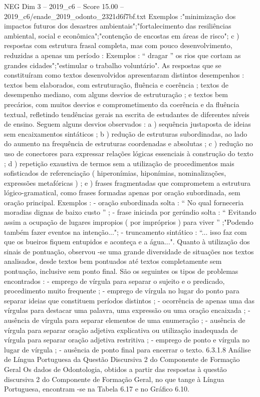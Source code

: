 \begin{textsample}{NEG Dim 3 – 2019\_c6 – Score 15.00 – 2019\_c6/enade\_2019\_odonto\_2321d6f7bf.txt}
Exemplos :"minimização dos impactos futuros dos desastres ambientais";"fortalecimento das resiliências ambiental, social e econômica";"contenção de encostas em áreas de risco"; c ) respostas com estrutura frasal completa, mas com pouco desenvolvimento, reduzidas a apenas um período : Exemplos : “ dragar ” os rios que cortam as grandes cidades";"estimular o trabalho voluntário".
As respostas que se constituíram como textos desenvolvidos apresentaram distintos desempenhos : textos bem elaborados, com estruturação, fluência e coerência ; textos de desempenho mediano, com alguns desvios de estruturação ; e textos bem precários, com muitos desvios e comprometimento da coerência e da fluência textual, refletindo tendências gerais na escrita de estudantes de diferentes níveis de ensino.
Seguem alguns desvios observados : a ) sequência justaposta de ideias sem encaixamentos sintáticos ; b ) redução de estruturas subordinadas, ao lado do aumento na frequência de estruturas coordenadas e absolutas ; c ) redução no uso de conectores para expressar relações lógicas essenciais à construção do texto ; d ) repetição exaustiva de termos sem a utilização de procedimentos mais sofisticados de referenciação ( hiperonímias, hiponímias, nominalizações, expressões metafóricas ) ; e ) frases fragmentadas que comprometem a estrutura lógico-gramatical, como frases formadas apenas por oração subordinada, sem oração principal.
Exemplos : - oração subordinada solta : “ No qual forneceria moradias dignas de baixo custo ” ; - frase iniciada por gerúndio solta : “ Evitando assim a ocupação de lugares impropios ( por impróprios ) para viver ” ;"Podendo também fazer eventos na intenção..."; - truncamento sintático : “... isso faz com que os bueiros fiquem entupidos e aconteça e a água...".
Quanto à utilização dos sinais de pontuação, observou -se uma grande diversidade de situações nos textos analisados, desde textos bem pontuados até textos completamente sem pontuação, inclusive sem ponto final.
São os seguintes os tipos de problemas encontrados : - emprego de vírgula para separar o sujeito e o predicado, procedimento muito frequente ; - emprego de vírgula no lugar do ponto para separar ideias que constituem períodos distintos ; - ocorrência de apenas uma das vírgulas para destacar uma palavra, uma expressão ou uma oração encaixada ; - ausência de vírgula para separar elementos de uma enumeração ; - ausência de vírgula para separar oração adjetiva explicativa ou utilização inadequada de vírgula para separar oração adjetiva restritiva ; - emprego de ponto e vírgula no lugar de vírgula ; - ausência de ponto final para encerrar o texto. 6.3.1.8 Análise de Língua Portuguesa da Questão Discursiva 2 do Componente de Formação Geral Os dados de Odontologia, obtidos a partir das respostas à questão discursiva 2 do Componente de Formação Geral, no que tange à Língua Portuguesa, encontram -se na Tabela 6.17 e no Gráfico 6.10.

\end{textsample}
